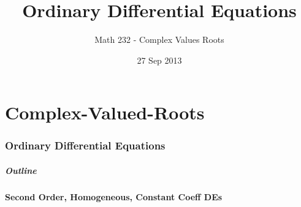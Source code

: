 \part{Complex-Valued-Roots}
\section{Ordinary Differential Equations}

\title{Ordinary Differential Equations}
\subtitle{Math 232 - Complex Values Roots}
\date{27 Sep 2013}

\begin{frame}
  \titlepage
\end{frame}

\begin{frame}
  \frametitle{Outline}
  \tableofcontents[currentsection]
\end{frame}


\subsection{Second Order, Homogeneous, Constant Coeff DEs}

